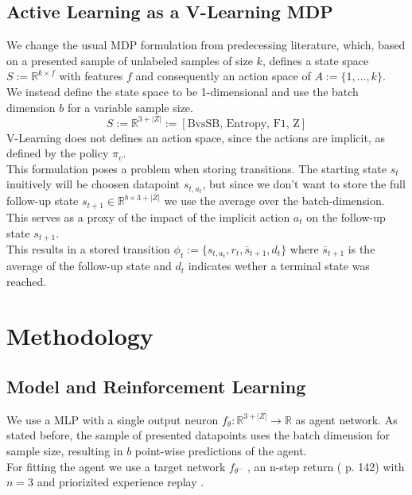 \documentclass[]{article}
\begin{document}
\subsection{Active Learning as a V-Learning MDP}
We change the usual MDP formulation from predecessing literature, which, based on a presented sample of unlabeled samples of size $k$, defines a state space $S := \mathbb{R}^{k \times f}$ with features $f$ and consequently an action space of $A := \{ 1, \ldots, k \}$. \\ [1mm]
We instead define the state space to be 1-dimensional and use the batch dimension $b$ for a variable sample size.
\begin{equation}
	S := \mathbb{R}^{3+|Z|} := [\text{BvsSB, Entropy, F1, Z}]
\end{equation}
V-Learning does not defines an action space, since the actions are implicit, as defined by the policy $\pi_v$. \\
This formulation poses a problem when storing transitions. The starting state $s_t$ inuitively will be choosen datapoint $s_{t, a_t}$, but since we don't want to store the full follow-up state $s_{t+1} \in \mathbb{R}^{b \times 3+|Z|}$ we use the average over the batch-dimension.
This serves as a proxy of the impact of the implicit action $a_t$ on the follow-up state $s_{t+1}$.\\
This results in a stored transition $\phi_t := \{ s_{t, a_t}, r_t, \bar{s}_{t+1}, d_t \}$ where $\bar{s}_{t+1}$ is the average of the follow-up state and $d_t$ indicates wether a terminal state was reached.

\section{Methodology}
\subsection{Model and Reinforcement Learning}
We use a MLP with a single output neuron $f_\theta : \mathbb{R}^{3+|Z|} \rightarrow \mathbb{R}$ as agent network.
As stated before, the sample of presented datapoints uses the batch dimension for sample size, resulting in $b$ point-wise predictions of the agent. \\
For fitting the agent we use a target network $f_{\theta^-}$ \cite{double_q_learning}, an n-step return (\cite{rl_intro} p. 142) with $n=3$ and priorizited experience replay \cite{prioritized_replay}.
\end{document}
